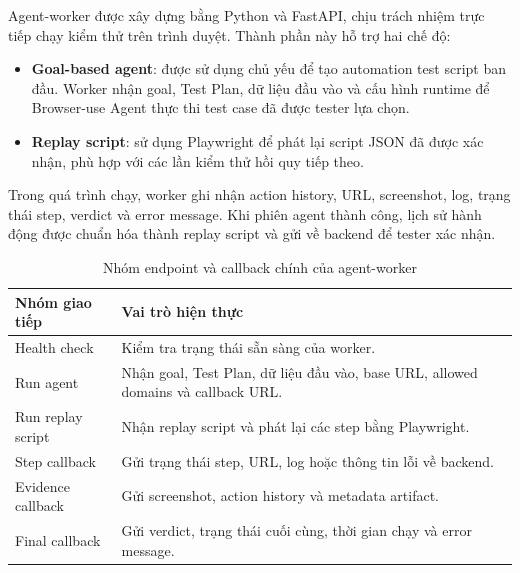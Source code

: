 Agent-worker được xây dựng bằng Python và FastAPI, chịu trách nhiệm trực tiếp chạy kiểm thử trên trình duyệt. Thành phần này hỗ trợ hai chế độ:

\begin{itemize}
    \item \textbf{Goal-based agent}: được sử dụng chủ yếu để tạo automation test script ban đầu. Worker nhận goal, Test Plan, dữ liệu đầu vào và cấu hình runtime để Browser-use Agent thực thi test case đã được tester lựa chọn.
    
    \item \textbf{Replay script}: sử dụng Playwright để phát lại script JSON đã được xác nhận, phù hợp với các lần kiểm thử hồi quy tiếp theo.
\end{itemize}

Trong quá trình chạy, worker ghi nhận action history, URL, screenshot, log, trạng thái step, verdict và error message. Khi phiên agent thành công, lịch sử hành động được chuẩn hóa thành replay script và gửi về backend để tester xác nhận.

\begin{table}[H]
\centering
\caption{Nhóm endpoint và callback chính của agent-worker}
\label{tab:chapter5_worker_endpoints}
\renewcommand{\arraystretch}{1.2}
\begin{tabular}{|p{4.0cm}|p{10.2cm}|}
\hline
\textbf{Nhóm giao tiếp} &
\textbf{Vai trò hiện thực} \\
\hline

Health check &
Kiểm tra trạng thái sẵn sàng của worker. \\
\hline

Run agent &
Nhận goal, Test Plan, dữ liệu đầu vào, base URL, allowed domains và callback URL. \\
\hline

Run replay script &
Nhận replay script và phát lại các step bằng Playwright. \\
\hline

Step callback &
Gửi trạng thái step, URL, log hoặc thông tin lỗi về backend. \\
\hline

Evidence callback &
Gửi screenshot, action history và metadata artifact. \\
\hline

Final callback &
Gửi verdict, trạng thái cuối cùng, thời gian chạy và error message. \\
\hline
\end{tabular}
\end{table}

